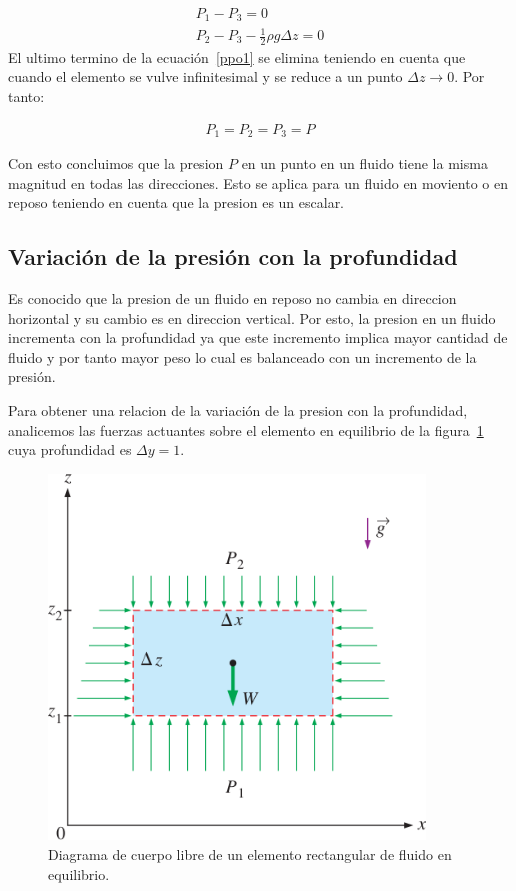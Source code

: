\documentclass[10pt, oneside]{article}
\begin{document}
\begin{equation}
\begin{split}
P_1 - P_3 = 0 \\
P_2 - P_3 - \frac{1}{2}\rho g \Delta z = 0
\label{ppo1}
\end{split}
\end{equation}
El ultimo termino de la ecuaci\'on~\ref{ppo1} se elimina teniendo en cuenta que cuando el elemento se vulve infinitesimal y se reduce a un punto $\Delta z \rightarrow 0$. Por tanto:

\begin{equation}
\begin{split}
P_1 = P_2 = P_3 = P
\label{ppo2}
\end{split}
\end{equation}

Con esto concluimos que la presion $P$ en un punto en un fluido tiene la misma magnitud en todas las direcciones. Esto se aplica para un fluido en moviento o en reposo teniendo en cuenta que la presion es un escalar. 

\subsection{Variaci\'on de la presi\'on con la profundidad}
Es conocido que la presion de un fluido en reposo no cambia en direccion horizontal y su cambio es en direccion vertical. Por esto, la presion en un fluido incrementa con la profundidad ya que este incremento implica mayor cantidad de fluido y por tanto mayor peso lo cual es balanceado con un incremento de la presi\'on.

Para obtener una relacion de la variaci\'on de la presion con la profundidad, analicemos las fuerzas actuantes sobre el elemento en equilibrio de la figura~\ref{pres2} cuya profundidad es $\Delta y =1$. 

\begin{figure}[h]
\centering
\includegraphics[width=10cm]{pres2}
\caption{Diagrama de cuerpo libre de un elemento rectangular de fluido en equilibrio.}
\label{pres2}
\end{figure}
\end{document}
